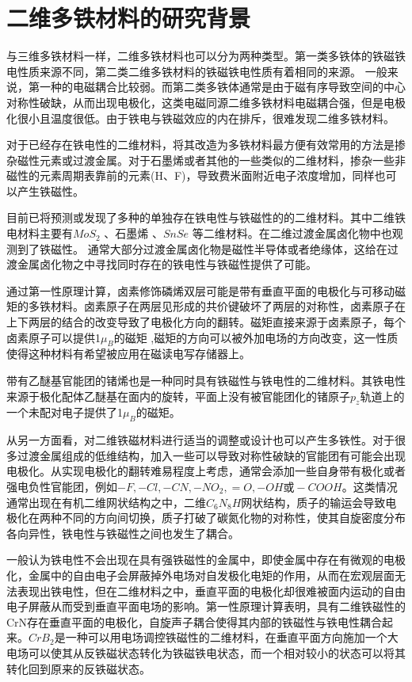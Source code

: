\section{二维多铁材料的研究背景}

与三维多铁材料一样，二维多铁材料也可以分为两种类型。第一类多铁体的铁磁铁电性质来源不同，第二类二维多铁材料的铁磁铁电性质有着相同的来源。\cite{wang2009multiferroicity:,dong2015multiferroic} 一般来说，第一种的电磁耦合比较弱。而第二类多铁体通常是由于磁有序导致空间的中心对称性破缺，从而出现电极化，这类电磁同源二维多铁材料电磁耦合强，但是电极化很小且温度很低。由于铁电与铁磁效应的内在排斥，很难发现二维多铁材料。

对于已经存在铁电性的二维材料，将其改造为多铁材料最方便有效常用的方法是掺杂磁性元素或过渡金属。对于石墨烯或者其他的一些类似的二维材料，掺杂一些非磁性的元素周期表靠前的元素(H、F)，导致费米面附近电子浓度增加，同样也可以产生铁磁性。

目前已将预测或发现了多种的单独存在铁电性与铁磁性的的二维材料。其中二维铁电材料主要有$MoS_{2}$ \cite{yuan2019room-temperature} 、石墨烯 \cite{kan2013high-temperature} 、$SnSe$ \cite{fei2016ferroelectricity} 等二维材料。在二维过渡金属卤化物中也观测到了铁磁性。\cite{huang2017layer-dependent} 通常大部分过渡金属卤化物是磁性半导体或者绝缘体，这给在过渡金属卤化物之中寻找同时存在的铁电性与铁磁性提供了可能。

通过第一性原理计算，卤素修饰磷烯双层可能是带有垂直平面的电极化与可移动磁矩的多铁材料。卤素原子在两层见形成的共价键破坏了两层的对称性，卤素原子在上下两层的结合的改变导致了电极化方向的翻转。磁矩直接来源于卤素原子，每个卤素原子可以提供1$\mu_{B}$的磁矩
,磁矩的方向可以被外加电场的方向改变，这一性质使得这种材料有希望被应用在磁读电写存储器上。

带有乙醚基官能团的锗烯也是一种同时具有铁磁性与铁电性的二维材料。其铁电性来源于极化配体乙醚基在面内的旋转，平面上没有被官能团化的锗原子$p_{z}$轨道上的一个未配对电子提供了1$\mu_{B}$的磁矩。

从另一方面看，对二维铁磁材料进行适当的调整或设计也可以产生多铁性。对于很多过渡金属组成的低维结构，加入一些可以导致对称性破缺的官能团有可能会出现电极化。从实现电极化的翻转难易程度上考虑，通常会添加一些自身带有极化或者强电负性官能团，例如$-F,-Cl,-CN,-NO_{2},=O,-OH \text{或}-COOH $。这类情况通常出现在有机二维网状结构之中，二维$C_{6}N_{8}H$网状结构，质子的输运会导致电极化在两种不同的方向间切换，质子打破了碳氮化物的对称性，使其自旋密度分布各向异性，铁电性与铁磁性之间也发生了耦合。

一般认为铁电性不会出现在具有强铁磁性的金属中，即使金属中存在有微观的电极化，金属中的自由电子会屏蔽掉外电场对自发极化电矩的作用，从而在宏观层面无法表现出铁电性，但在二维材料之中，垂直平面的电极化却很难被面内运动的自由电子屏蔽从而受到垂直平面电场的影响。第一性原理计算表明，具有二维铁磁性的CrN存在垂直平面的电极化，自旋声子耦合使得其内部的铁磁性与铁电性耦合起来。$CrB_{2}$是一种可以用电场调控铁磁性的二维材料，在垂直平面方向施加一个大电场可以使其从反铁磁状态转化为铁磁铁电状态，而一个相对较小的状态可以将其转化回到原来的反铁磁状态。

